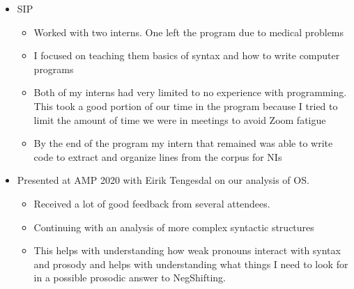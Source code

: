 \documentclass[12pt, letterpaper]{article}
\begin{document}
\begin{itemize}
\item SIP
\begin{itemize}
	\item Worked with two interns. One left the program due to medical problems
	\item I focused on teaching them basics of syntax and how to write computer programs
	\item Both of my interns had very limited to no experience with programming. This took a good portion of our time in the program because I tried to limit the amount of time we were in meetings to avoid Zoom fatigue
	\item By the end of the program my intern that remained was able to write code to extract and organize lines from the corpus for NIs
\end{itemize}

\item Presented at AMP 2020 with Eirik Tengesdal on our analysis of OS.
\begin{itemize}
	\item Received a lot of good feedback from several attendees.
	\item Continuing with an analysis of more complex syntactic structures
	\item This helps with understanding how weak pronouns interact with syntax and prosody and helps with understanding what things I need to look for in a possible prosodic answer to NegShifting.
\end{itemize}
\end{itemize}

\end{document}
